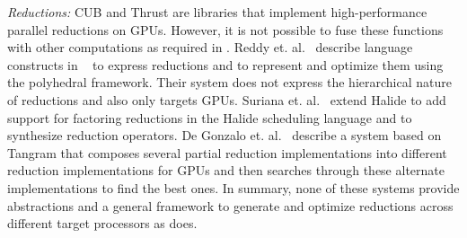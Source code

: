 \emph{Reductions:} CUB\cite{CUB} and Thrust\cite{Thrust} are libraries 
that implement high-performance parallel reductions on GPUs. 
However, it is not possible to fuse these functions with other computations  
as required in \Treebeard{}. Reddy et. al.~\cite{ChandanReduction}
describe language constructs in {}~\cite{Pencil}
to express reductions and to represent and optimize them using the polyhedral 
framework. 
Their system does not express the hierarchical nature of 
reductions and also only targets GPUs. Suriana et. al.~\cite{HalideReductions}
extend Halide to add support for factoring reductions in the Halide 
scheduling language and to synthesize reduction operators. De Gonzalo 
et. al.~\cite{TangramReduction} describe a system based on Tangram 
that composes several partial reduction implementations into different 
reduction implementations for GPUs and then searches through these
alternate implementations to find the best ones. In summary, none of 
these systems provide abstractions and a general framework to generate 
and optimize reductions across different target processors as \Treebeard{} does.